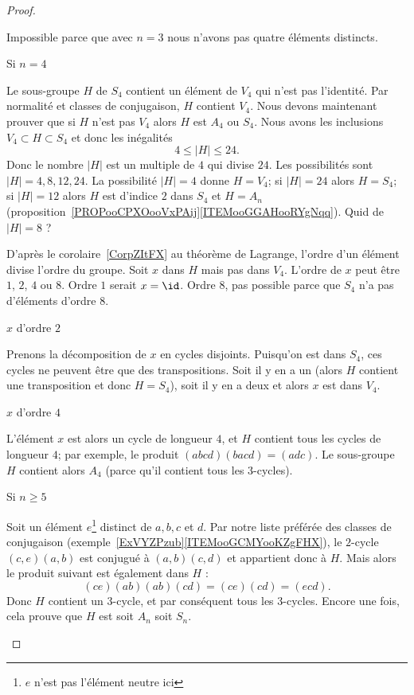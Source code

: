 \begin{proof}
\begin{subproof}
\begin{subproof}
			Impossible parce que avec \( n=3\) nous n'avons pas quatre éléments distincts.

			\item[Si \( n=4\)]

			Le sous-groupe \( H\) de \( S_4\) contient un élément de \( V_4\) qui n'est pas l'identité. Par normalité et classes de conjugaison, \( H\) contient \( V_4\). Nous devons maintenant prouver que si \( H\) n'est pas \( V_4\) alors \( H\) est \( A_4\) ou \( S_4\). Nous avons les inclusions \( V_4\subset H\subset S_4\) et donc les inégalités
			\begin{equation}
				4\leq | H |\leq 24.
			\end{equation}
			Donc le nombre \( | H |\) est un multiple de \( 4\) qui divise \( 24\). Les possibilités sont \( | H |=4,8,12,24\). La possibilité \( | H |=4\) donne \( H=V_4\); si \( |H |=24\) alors \( H=S_4\); si \( | H |=12\) alors \( H\) est d'indice \( 2\) dans \( S_4\) et \( H=A_n\) (proposition~\ref{PROPooCPXOooVxPAij}\ref{ITEMooGGAHooRYgNqq}). Quid de \( | H |=8\) ?

			D'après le corolaire~\ref{CorpZItFX} au théorème de Lagrange, l'ordre d'un élément divise l'ordre du groupe. Soit \( x\) dans \( H\) mais pas dans \( V_4\). L'ordre de \( x\) peut être \( 1\), \( 2\), \( 4\) ou \( 8\). Ordre \( 1\) serait \( x=\id\). Ordre \( 8\), pas possible parce que \( S_4\) n'a pas d'éléments d'ordre \( 8\).
			\begin{subproof}
				\item[\( x\) d'ordre \( 2\)]

				Prenons la décomposition de \( x\) en cycles disjoints. Puisqu'on est dans \( S_4\), ces cycles ne peuvent être que des transpositions. Soit il y en a un (alors \( H\) contient une transposition et donc \( H=S_4\)), soit il y en a deux et alors \( x\) est dans \( V_4\).

				\item[\( x\) d'ordre \( 4\)]

				L'élément \( x\) est alors un cycle de longueur \( 4\), et \( H\) contient tous les cycles de longueur \( 4\); par exemple, le produit \( (abcd)(bacd)=(adc)\). Le sous-groupe \( H\) contient alors \( A_4\) (parce qu'il contient tous les \( 3\)-cycles).
			\end{subproof}

			\item[Si \( n\geq 5\)]

			Soit un élément \( e\)\footnote{\( e\) n'est pas l'élément neutre ici} distinct de \( a,b,c\) et \( d\). Par notre liste préférée des classes de conjugaison (exemple~\ref{ExVYZPzub}\ref{ITEMooGCMYooKZgFHX}), le \( 2\)-cycle \( (c,e)(a,b)\) est conjugué à \( (a,b)(c,d)\) et appartient donc à \( H\). Mais alors le produit suivant est également dans \( H\) :
			\begin{equation}
				(ce)(ab)(ab)(cd)=(ce)(cd)=(ecd).
			\end{equation}
			Donc \( H\) contient un \( 3\)-cycle, et par conséquent tous les \( 3\)-cycles. Encore une fois, cela prouve que \( H\) est soit \( A_n\) soit \( S_n\).


\end{subproof}
\end{subproof}
\end{proof}
